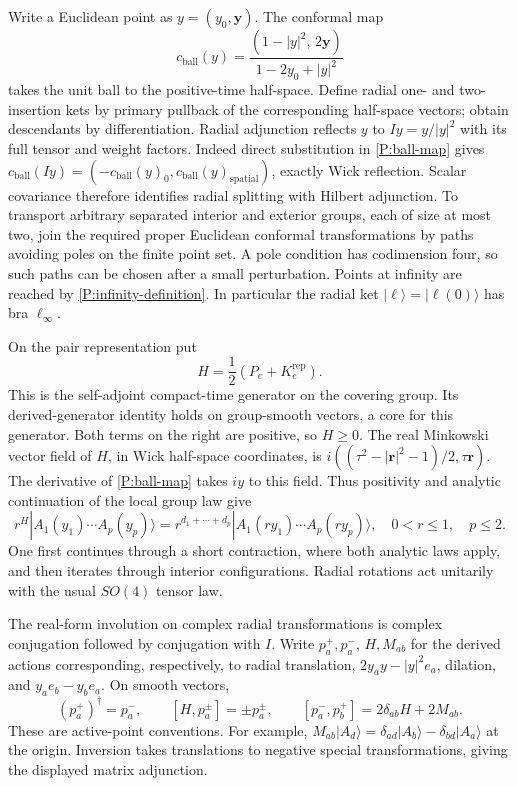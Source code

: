 Write a Euclidean point as $y=(y_0,\boldsymbol y)$.  The conformal map
\begin{equation}
 c_{\mathrm{ball}}(y)=
 \frac{(1-|y|^2,\,2\boldsymbol y)}{1-2y_0+|y|^2}
 \label{P:ball-map}
\end{equation}
takes the unit ball to the positive-time half-space.  Define radial
one- and two-insertion kets by primary pullback of the corresponding
half-space vectors; obtain descendants by differentiation.  Radial
adjunction reflects $y$ to $Iy=y/|y|^2$ with its full tensor and
weight factors.  Indeed direct substitution in
\eqref{P:ball-map} gives
$c_{\mathrm{ball}}(Iy)=(-c_{\mathrm{ball}}(y)_0,
 c_{\mathrm{ball}}(y)_{\mathrm{spatial}})$, exactly Wick reflection.
Scalar covariance therefore identifies radial splitting with Hilbert
adjunction.  To transport arbitrary separated interior and exterior
groups, each of size at most two, join the required proper Euclidean
conformal transformations by paths avoiding poles on the finite point
set.  A pole condition has codimension four, so such paths can be
chosen after a small perturbation.  Points at infinity are reached by
\eqref{P:infinity-definition}.  In particular the radial ket
$|\ell\rangle=|\ell(0)\rangle$ has bra $\ell_\infty$.

On the pair representation put
\begin{equation}
 H=\frac12(P_e+K_e^{\mathrm{rep}}).
 \label{P:radial-H}
\end{equation}
This is the self-adjoint compact-time generator on the covering group.
Its derived-generator identity holds on group-smooth vectors, a core
for this generator.  Both terms on the right are positive, so $H\geq0$.
The real Minkowski vector field of $H$, in Wick half-space coordinates,
is
$i((\tau^2-|\boldsymbol r|^2-1)/2,\tau\boldsymbol r)$.
The derivative of \eqref{P:ball-map} takes $iy$ to this field.  Thus
positivity and analytic continuation of the local group law give
\begin{equation}
 r^H|A_1(y_1)\cdots A_p(y_p)\rangle
   =r^{d_1+\cdots+d_p}
       |A_1(ry_1)\cdots A_p(ry_p)\rangle,
 \quad 0<r\leq1,\quad p\leq2.
 \label{P:radial-contraction}
\end{equation}
One first continues through a short contraction, where both analytic
laws apply, and then iterates through interior configurations.
Radial rotations act unitarily with the usual $SO(4)$ tensor law.

The real-form involution on complex radial transformations is complex
conjugation followed by conjugation with $I$.  Write $p_a^+,p_a^-$,
$H,M_{ab}$ for the derived actions corresponding, respectively, to
radial translation, $2y_a y-|y|^2e_a$, dilation, and
$y_a e_b-y_b e_a$.  On smooth vectors,
\begin{equation}
 (p_a^+)^\dagger=p_a^-,\qquad
 [H,p_a^\pm]=\pm p_a^\pm,\qquad
 [p_a^-,p_b^+]=2\delta_{ab}H+2M_{ab}.
 \label{P:radial-algebra}
\end{equation}
These are active-point conventions.  For example,
$M_{ab}|A_d\rangle=\delta_{ad}|A_b\rangle-\delta_{bd}|A_a\rangle$
at the origin.  Inversion takes translations to negative special
transformations, giving the displayed matrix adjunction.


